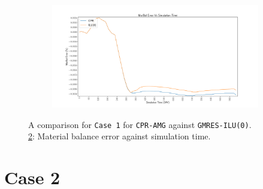 \begin{figure}
\centering
\begin{subfigure}[b]{\textwidth}
   \includegraphics[width=1\linewidth]{figures/case1/matbalerr_time.pdf}
   \caption{}
   \label{case1_matbalerr}
\end{subfigure}

\caption[caption]{A comparison for \texttt{Case 1} for \texttt{CPR-AMG} against \texttt{GMRES-ILU(0)}.\\\hspace{\textwidth}
	\cref{case1_matbalerr}: Material balance error against simulation time. \\\hspace{\textwidth}}
\end{figure}

\clearpage

\section{Case 2}

